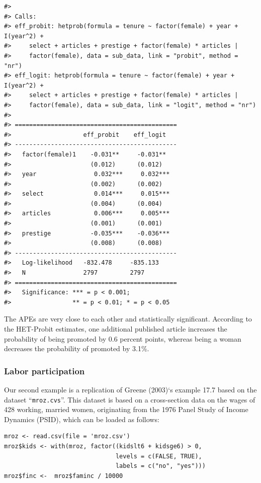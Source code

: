 \begin{verbatim}
#> 
#> Calls:
#> eff_probit: hetprob(formula = tenure ~ factor(female) + year + I(year^2) + 
#>     select + articles + prestige + factor(female) * articles | 
#>     factor(female), data = sub_data, link = "probit", method = "nr")
#> eff_logit: hetprob(formula = tenure ~ factor(female) + year + I(year^2) + 
#>     select + articles + prestige + factor(female) * articles | 
#>     factor(female), data = sub_data, link = "logit", method = "nr")
#> 
#> =============================================
#>                    eff_probit    eff_logit   
#> ---------------------------------------------
#>   factor(female)1    -0.031**     -0.031**   
#>                      (0.012)      (0.012)    
#>   year                0.032***     0.032***  
#>                      (0.002)      (0.002)    
#>   select              0.014***     0.015***  
#>                      (0.004)      (0.004)    
#>   articles            0.006***     0.005***  
#>                      (0.001)      (0.001)    
#>   prestige           -0.035***    -0.036***  
#>                      (0.008)      (0.008)    
#> ---------------------------------------------
#>   Log-likelihood   -832.478     -835.133     
#>   N                2797         2797         
#> =============================================
#>   Significance: *** = p < 0.001;   
#>                 ** = p < 0.01; * = p < 0.05
\end{verbatim}

The APEs are very close to each other and statistically significant. According to the HET-Probit estimates, one additional published article increases the probability of being promoted by 0.6 percent points, whereas being a woman decreases the probability of promoted by 3.1\%.

\hypertarget{labor-participation}{%
\subsubsection{Labor participation}\label{labor-participation}}

Our second example is a replication of Greene (2003)`s example 17.7 based on the dataset ``\texttt{mroz.cvs}''. This dataset is based on a cross-section data on the wages of 428 working, married women, originating from the 1976 Panel Study of Income Dynamics (PSID), which can be loaded as follows:

\begin{verbatim}
mroz <- read.csv(file = 'mroz.csv')
mroz$kids <- with(mroz, factor((kidslt6 + kidsge6) > 0,
                               levels = c(FALSE, TRUE), 
                               labels = c("no", "yes")))
mroz$finc <-  mroz$faminc / 10000
\end{verbatim}

